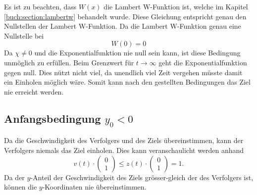 %
Es ist zu beachten, dass $W(x)$ die Lambert W-Funktion ist, welche im Kapitel  \eqref{buch:section:lambertw} behandelt wurde.
Diese Gleichung entspricht genau den Nullstellen der Lambert W-Funktion. Da die Lambert W-Funktion genau eine Nullstelle bei
\begin{equation}
    W(0)=0
\end{equation}
%
Da $\chi\neq0$ und die Exponentialfunktion nie null sein kann, ist diese Bedingung unmöglich zu erfüllen.
Beim Grenzwert für $t\rightarrow\infty$ geht die Exponentialfunktion gegen null.
Dies nützt nicht viel, da unendlich viel Zeit vergehen müsste damit ein Einholen möglich wäre.
Somit kann nach den gestellten Bedingungen das Ziel nie erreicht werden.
%
%
%
%
%
%
%
%
%
\subsection{Anfangsbedingung $y_0<0$}
Da die Geschwindigkeit des Verfolgers und des Ziels übereinstimmen, kann der Verfolgers niemals das Ziel einholen.
Dies kann veranschaulicht werden anhand
%
\begin{equation}
    v(t)\cdot \left( \begin{array}{c} 0 \\ 1 \end{array}\right) 
    \leq
    z(t)\cdot \left( \begin{array}{c} 0 \\ 1 \end{array}\right) 
    =
    1\text{.}
\end{equation}
%
Da der $y$-Anteil der Geschwindigkeit des Ziels grösser-gleich der des Verfolgers ist, können die $y$-Koordinaten nie übereinstimmen.
%

